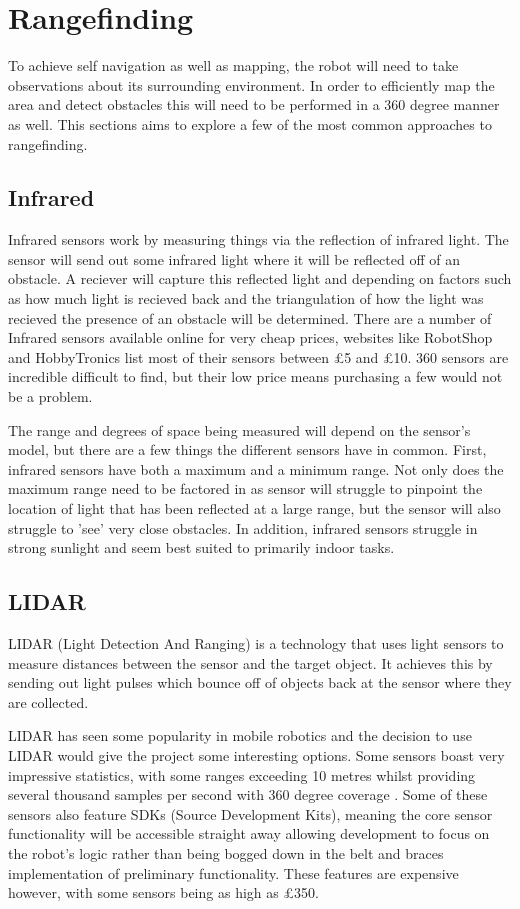 			\section{Rangefinding}
			To achieve self navigation as well as mapping, the robot will need to take observations about its surrounding environment. In order to efficiently map the area and detect obstacles this will need to be performed in a 360 degree manner as well. This sections aims to explore a few of the most common approaches to rangefinding.
			
				\subsection{Infrared}
				Infrared sensors work by measuring things via the reflection of infrared light. The sensor will send out some infrared light where it will be reflected off of an obstacle. A reciever will capture this reflected light and depending on factors such as how much light is recieved back and the triangulation of how the light was recieved the presence of an obstacle will be determined. There are a number of Infrared sensors available online for very cheap prices, websites like RobotShop and HobbyTronics list most of their sensors between £5 and £10. 360 sensors are incredible difficult to find, but their low price means purchasing a few would not be a problem.
				
				The range and degrees of space being measured will depend on the sensor's model, but there are a few things the different sensors have in common. First, infrared sensors have both a maximum and a minimum range. Not only does the maximum range need to be factored in as sensor will struggle to pinpoint the location of light that has been reflected at a large range, but the sensor will also struggle to 'see' very close obstacles. In addition, infrared sensors struggle in strong sunlight and seem best suited to primarily indoor tasks.
				
				
				\subsection{LIDAR}
				LIDAR (Light Detection And Ranging) is a technology that uses light sensors to measure distances between the sensor and the target object. It achieves this by sending out light pulses which bounce off of objects back at the sensor where they are collected.
				
				LIDAR has seen some popularity in mobile robotics and the decision to use LIDAR would give the project some interesting options. Some sensors boast very impressive statistics, with some ranges exceeding 10 metres whilst providing several thousand samples per second with 360 degree coverage \citep{slamtecA1M8}. Some of these sensors also feature SDKs (Source Development Kits), meaning the core sensor functionality will be accessible straight away allowing development to focus on the robot's logic rather than being bogged down in the belt and braces implementation of preliminary functionality. These features are expensive however, with some sensors being as high as \pounds{350}.
				
